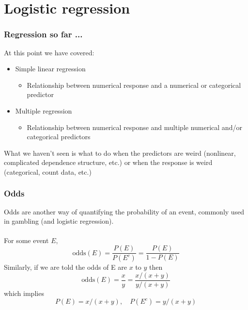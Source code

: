 
\section{Logistic regression}


\begin{frame}
\frametitle{Regression so far ...}
    
At this point we have covered:

{\small
\begin{itemize}
\item Simple linear regression
\begin{itemize}
\item Relationship between numerical response and a numerical or categorical predictor
\end{itemize}
\pause
\item Multiple regression
\begin{itemize}
\item Relationship between numerical response and multiple numerical and/or categorical predictors
\end{itemize}
\end{itemize}
}

\pause

What we haven't seen is what to do when the predictors are weird (nonlinear, complicated dependence structure, etc.) or when the response is weird (categorical, count data, etc.)


\end{frame}


\begin{frame}
\frametitle{Odds}

\vspace{-2mm}

Odds are another way of quantifying the probability of an event, commonly used in gambling (and logistic regression).\\

~\\

{
For some event $E$,
{\small
\[\text{odds}(E) = \frac{P(E)}{P(E^c)} = \frac{P(E)}{1-P(E)}\]
}
Similarly, if we are told the odds of E are $x$ to $y$ then
{\small
\[\text{odds}(E) = \frac{x}{y} = \frac{x/(x+y)}{y/(x+y)} \]
}
which implies
{\small
\[P(E) = x/(x+y),\quad P(E^c) = y/(x+y)\]
}
}

\end{frame}

